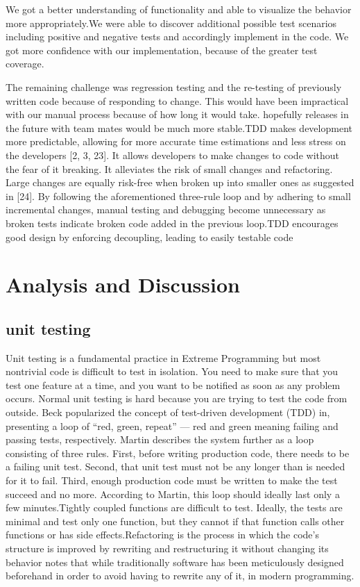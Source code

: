 \documentclass{article}
\begin{document}
{We got a better understanding of functionality and able to visualize the behavior more appropriately.We were able to discover additional possible test scenarios including positive and negative tests and accordingly implement in the code.
We  got more confidence with our implementation, because of the greater test coverage.

The remaining challenge was regression testing and the re-testing of previously written code because of responding to change. This would have been impractical with our manual process because of how long it would take. hopefully releases in the future with team mates would be much more stable.TDD makes development more predictable, allowing for more accurate time
estimations and less stress on the developers [2, 3, 23]. It allows developers
to make changes to code without the fear of it breaking. It alleviates the
risk of small changes and refactoring. Large changes are equally risk-free
when broken up into smaller ones as suggested in [24]. By following the
aforementioned three-rule loop and by adhering to small incremental changes,
manual testing and debugging become unnecessary as broken tests indicate
broken code added in the previous loop.TDD encourages good design by enforcing decoupling, leading to easily testable code

\newpage 

\section{Analysis and Discussion}
\subsection{ unit testing}
   Unit testing is a fundamental practice in Extreme Programming but most nontrivial code is difficult to test in isolation. You need to make sure that you test one feature at a
time, and you want to be notified as soon as any problem occurs. Normal unit testing is hard
because you are trying to test the code from outside.
    Beck popularized the concept of test-driven development (TDD) in\cite{kong_chapter_2021}, presenting a loop of “red, green, repeat” — red and green meaning failing and
passing tests, respectively. Martin describes the system further as a
loop consisting of three rules. First, before writing production code, there
needs to be a failing unit test. Second, that unit test must not be any longer
than is needed for it to fail. Third, enough production code must be written
to make the test succeed and no more. According to Martin, this loop should
ideally last only a few minutes.Tightly coupled functions are difficult to test. Ideally, the tests are minimal and test only one function, but they cannot if that function calls other functions or has side effects.Refactoring is the process in which the code’s structure is improved by rewriting and restructuring it without changing its behavior notes that while traditionally software has been meticulously designed beforehand in order to avoid having to rewrite any of it, in modern programming.

}
\end{document}
